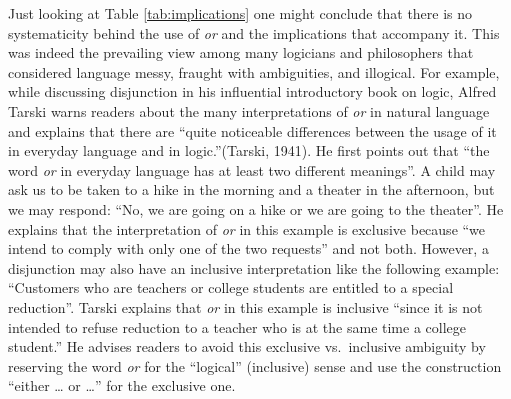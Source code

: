 \documentclass[oneside]{report}
\theoremstyle{definition}
\theoremstyle{definition}
\theoremstyle{definition}
\theoremstyle{remark}
\begin{document}
Just looking at Table \ref{tab:implications} one might conclude that
there is no systematicity behind the use of \emph{or} and the
implications that accompany it. This was indeed the prevailing view
among many logicians and philosophers that considered language messy,
fraught with ambiguities, and illogical. For example, while discussing
disjunction in his influential introductory book on logic, Alfred Tarski
warns readers about the many interpretations of \emph{or} in natural
language and explains that there are ``quite noticeable differences
between the usage of it in everyday language and in logic.''(Tarski,
1941). He first points out that ``the word \emph{or} in everyday
language has at least two different meanings''. A child may ask us to be
taken to a hike in the morning and a theater in the afternoon, but we
may respond: ``No, we are going on a hike or we are going to the
theater''. He explains that the interpretation of \emph{or} in this
example is exclusive because ``we intend to comply with only one of the
two requests'' and not both. However, a disjunction may also have an
inclusive interpretation like the following example: ``Customers who are
teachers or college students are entitled to a special reduction''.
Tarski explains that \emph{or} in this example is inclusive ``since it
is not intended to refuse reduction to a teacher who is at the same time
a college student.'' He advises readers to avoid this exclusive
vs.~inclusive ambiguity by reserving the word \emph{or} for the
``logical'' (inclusive) sense and use the construction ``either \ldots{}
or \ldots{}'' for the exclusive one.
\end{document}
